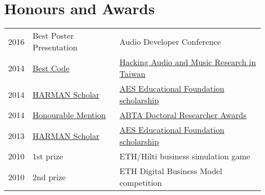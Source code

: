 \documentclass[letterpaper]{deedy-resume} %
\begin{document}
{\begin{minipage}[t]{0.66\textwidth}


\section{Honours and Awards} 

\begin{tabular}{@{}rll}
2016 & Best Poster Presentation & Audio Developer Conference\\
2014 & \href{http://labrosa.ee.columbia.edu/hamr_ismir2014/proceedings/doku.php?id=intelligent_audio_switch_box}{Best Code} & \href{http://labrosa.ee.columbia.edu/hamr_ismir2014/proceedings/doku.php?id=intelligent_audio_switch_box}{Hacking Audio and Music Research in Taiwan}\\
2014 & \href{http://www.aes.org/education/foundation/awards.cfm}{HARMAN Scholar} & \href{http://www.aes.org/education/foundation/awards.cfm}{AES Educational Foundation scholarship}\\
2014 & \href{http://www.abtanet.org.uk/Awards/Detail/6/2014-ABTA-Doctoral-Researcher-Awards/}{Honourable Mention} & \href{http://www.abtanet.org.uk/Awards/Detail/6/2014-ABTA-Doctoral-Researcher-Awards/}{ABTA Doctoral Researcher Awards} \\
2013 & \href{http://www.aes.org/press/?ID=215}{HARMAN Scholar} & \href{http://www.aes.org/press/?ID=215}{AES Educational Foundation scholarship}\\
2010 & 1st prize & ETH/Hilti business simulation game\\
2010 & 2nd prize & ETH Digital Business Model competition
\end{tabular}

\sectionspace %


\end{minipage} %




}
\end{document}
